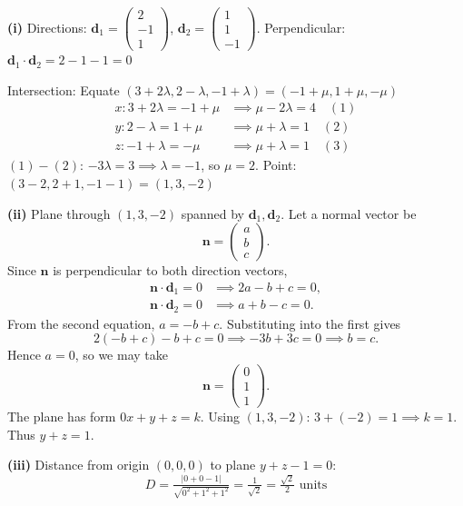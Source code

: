 \begin{solution}
\textbf{(i)} Directions: $\mathbf{d}_1 = \begin{pmatrix} 2 \\ -1 \\ 1 \end{pmatrix}$, $\mathbf{d}_2 = \begin{pmatrix} 1 \\ 1 \\ -1 \end{pmatrix}$.
Perpendicular: $\mathbf{d}_1 \cdot \mathbf{d}_2 = 2 - 1 - 1 = 0$ \checkmark

Intersection: Equate $(3+2\lambda, 2-\lambda, -1+\lambda) = (-1+\mu, 1+\mu, -\mu)$
\begin{align*}
x: 3+2\lambda = -1+\mu &\implies \mu - 2\lambda = 4 \quad (1)\\
y: 2-\lambda = 1+\mu &\implies \mu + \lambda = 1 \quad (2)\\
z: -1+\lambda = -\mu &\implies \mu + \lambda = 1 \quad (3)
\end{align*}
$(1)-(2)$: $-3\lambda = 3 \implies \lambda = -1$, so $\mu = 2$.
Point: $(3-2, 2+1, -1-1) = (1, 3, -2)$ \checkmark

\textbf{(ii)} Plane through $(1,3,-2)$ spanned by $\mathbf{d}_1, \mathbf{d}_2$. Let a normal vector be
\[
\mathbf{n} = \begin{pmatrix} a \\ b \\ c \end{pmatrix}.
\]
Since $\mathbf{n}$ is perpendicular to both direction vectors,
\begin{align*}
\mathbf{n} \cdot \mathbf{d}_1 = 0 &\implies 2a - b + c = 0,\\
\mathbf{n} \cdot \mathbf{d}_2 = 0 &\implies a + b - c = 0.
\end{align*}
From the second equation, $a = -b + c$. Substituting into the first gives
\[
2(-b+c) - b + c = 0 \implies -3b + 3c = 0 \implies b = c.
\]
Hence $a = 0$, so we may take
\[
\mathbf{n} = \begin{pmatrix} 0 \\ 1 \\ 1 \end{pmatrix}.
\]
The plane has form $0x + y + z = k$.
Using $(1,3,-2)$: $3 + (-2) = 1 \implies k = 1$. Thus $y + z = 1$.

\textbf{(iii)} Distance from origin $(0,0,0)$ to plane $y + z - 1 = 0$:
$$D = \tfrac{|0 + 0 - 1|}{\sqrt{0^2 + 1^2 + 1^2}} = \tfrac{1}{\sqrt{2}} = \tfrac{\sqrt{2}}{2} \text{ units}$$
\end{solution}

